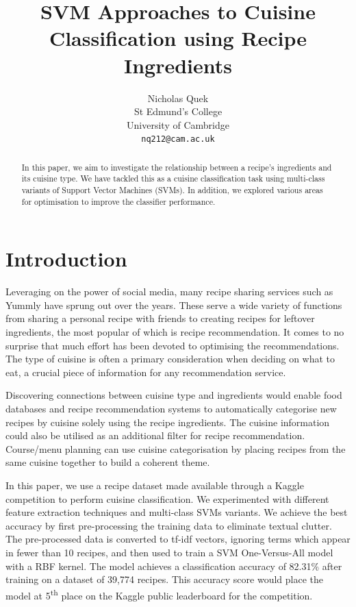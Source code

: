\documentclass{article}
\title{SVM Approaches to Cuisine Classification using Recipe Ingredients}
\author{%
  Nicholas Quek \\
  St Edmund's College\\
  University of Cambridge\\
  \texttt{nq212@cam.ac.uk} \\
}
\begin{document}
\maketitle

\begin{abstract}

In this paper, we aim to investigate the relationship between a recipe's ingredients and its cuisine type. We have tackled this as a cuisine classification task using multi-class variants of Support Vector Machines (SVMs). In addition, we explored various areas for optimisation to improve the classifier performance. 

\end{abstract}

\section{Introduction}

Leveraging on the power of social media, many recipe sharing services such as Yummly \cite{yummly} have sprung out over the years. These serve a wide variety of functions from sharing a personal recipe with friends to creating recipes for leftover ingredients, the most popular of which is recipe recommendation. It comes to no surprise that much effort has been devoted to optimising the recommendations. The type of cuisine is often a primary consideration when deciding on what to eat, a crucial piece of information for any recommendation service.

Discovering connections between cuisine type and ingredients would enable food databases and recipe recommendation systems to automatically categorise new recipes by cuisine solely using the recipe ingredients. The cuisine information could also be utilised as an additional filter for recipe recommendation. Course/menu planning can use cuisine categorisation by placing recipes from the same cuisine together to build a coherent theme.

In this paper, we use a recipe dataset made available through a Kaggle competition to perform cuisine classification. We experimented with different feature extraction techniques and multi-class SVMs variants. We achieve the best accuracy by first pre-processing the training data to eliminate textual clutter. The pre-processed data is converted to tf-idf vectors, ignoring terms which appear in fewer than 10 recipes, and then used to train a SVM One-Versus-All model with a RBF kernel. The model achieves a classification accuracy of 82.31\% after training on a dataset of 39,774 recipes. This accuracy score would place the model at 5\textsuperscript{th} place on the Kaggle public leaderboard for the competition.
\end{document}
